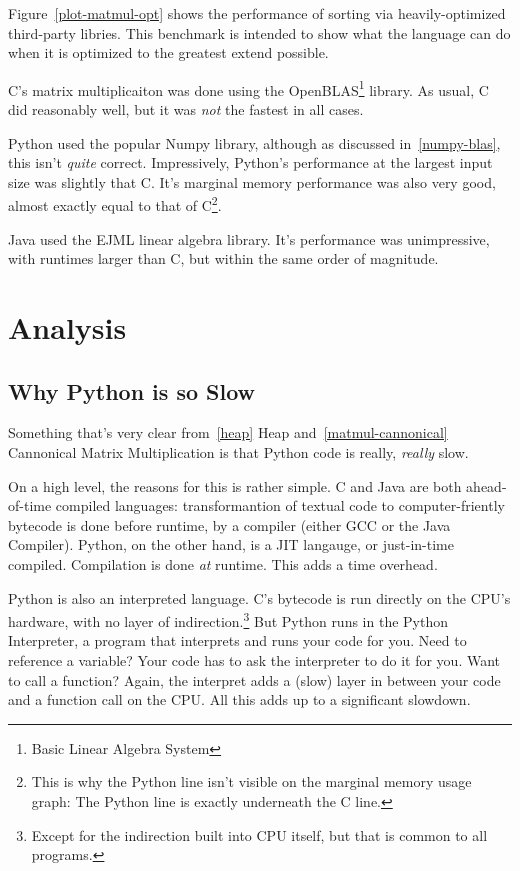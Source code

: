 \documentclass[12pt,letterpaper]{article}
\begin{document}
Figure~\ref{plot-matmul-opt} shows the performance of sorting via
heavily-optimized third-party libries. This benchmark is intended to show what
the language can do when it is optimized to the greatest extend possible.

C's matrix multiplicaiton was done using the OpenBLAS\footnote{Basic Linear
Algebra System} library. As usual, C did reasonably well, but it was \emph{not}
the fastest in all cases.

Python used the popular Numpy library, although as discussed
in~\ref{numpy-blas}, this isn't \emph{quite} correct. Impressively, Python's
performance at the largest input size was slightly that C. It's marginal memory
performance was also very good, almost exactly equal to that of C\footnote{This
is why the Python line isn't visible on the marginal memory usage graph: The
Python line is exactly underneath the C line.}.

Java used the EJML linear algebra library. It's performance was unimpressive,
with runtimes larger than C, but within the same order of magnitude.

\section{Analysis}

\subsection{Why Python is so Slow}\label{python-slow}

Something that's very clear from~\ref{heap} Heap and~\ref{matmul-cannonical}
Cannonical Matrix Multiplication is that Python code is really, \emph{really}
slow.

On a high level, the reasons for this is rather simple. C and Java are both
ahead-of-time compiled languages: transformantion of textual code to
computer-friently bytecode is done before runtime, by a compiler (either GCC or
the Java Compiler). Python, on the other hand, is a JIT langauge, or
just-in-time compiled. Compilation is done \emph{at} runtime. This adds a time
overhead.

Python is also an interpreted language. C's bytecode is run directly on the
CPU's hardware, with no layer of indirection.\footnote{Except for the
indirection built into CPU itself, but that is common to all programs.} But
Python runs in the Python Interpreter, a program that interprets and runs your
code for you. Need to reference a variable? Your code has to ask the
interpreter to do it for you. Want to call a function? Again, the interpret
adds a (slow) layer in between your code and a function call on the CPU. All
this adds up to a significant slowdown.
\end{document}
